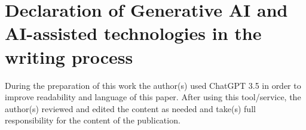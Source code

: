 
\section*{Declaration of Generative AI and AI-assisted technologies in the writing process}

During the preparation of this work the author(s) used ChatGPT 3.5 in order to improve readability and language of this paper. After using this tool/service, the author(s) reviewed and edited the content as needed and take(s) full responsibility for the content of the publication.